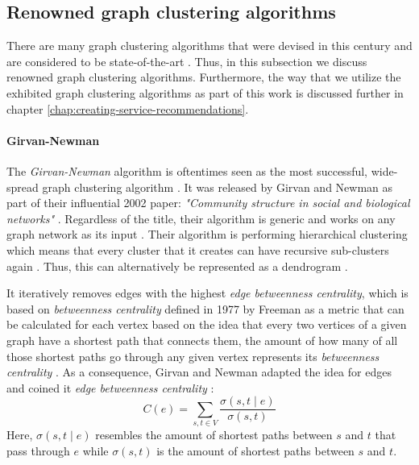 \documentclass[12pt,a4paper]{report}
\begin{document}
\subsection{Renowned graph clustering algorithms} \label{subsect:renowned-graph-clustering-algorithms}

There are many graph clustering algorithms that were devised in this century
and are considered to be state-of-the-art
\cite{lancichinetti2009community, fortunato2010community, danon2005comparing}.
Thus, in this subsection we discuss renowned graph clustering algorithms.
Furthermore, the way that we utilize the exhibited graph clustering algorithms
as part of this work is discussed further in chapter
\ref{chap:creating-service-recommendations}.

\paragraph{Girvan-Newman \cite{girvan2002community}}
The \textit{Girvan-Newman} algorithm is oftentimes seen as the most successful,
wide-spread graph clustering algorithm \cite{lancichinetti2009community}.
It was released by Girvan and Newman as part of their influential 2002 paper:
\textit{"Community structure in social and biological networks"} \cite{girvan2002community}.
Regardless of the title, their algorithm is generic and works on any graph network
as its input \cite{lancichinetti2009community}.
Their algorithm is performing hierarchical clustering which means that
every cluster that it creates can have recursive sub-clusters
again \cite{girvan2002community}.
Thus, this can alternatively be represented as a dendrogram \cite{newman2004fast}.

It iteratively removes edges with the highest
\textit{edge betweenness centrality}, which is based on
\textit{betweenness centrality} defined in 1977 by Freeman as
a metric that can be calculated for each vertex based on the idea that every
two vertices of a given graph have a shortest path that connects them,
the amount of how many of all those shortest paths go through any given vertex
represents its \textit{betweenness centrality} \cite{freeman1977set}.
As a consequence, Girvan and Newman adapted the idea for edges and coined it
\textit{edge betweenness centrality} \cite{girvan2002community}:
\[
  C(e) = \sum_{s, t \in V} \frac{\sigma(s, t \mid e)}{\sigma(s, t)}
\]
Here, \(\sigma(s, t \mid e)\) resembles the amount of shortest paths
between \(s\) and \(t\) that pass through \(e\) while \(\sigma(s, t)\)
is the amount of shortest paths between \(s\) and \(t\).
\end{document}
